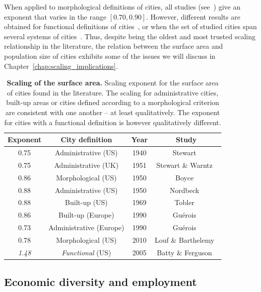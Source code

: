 When applied to morphological definitions of cities, all studies
(see~\cite{Batty:2011}) give an exponent that varies in the range $[0.70,
0.90]$. However, different results are obtained for functional definitions of
cities~\cite{Batty:2011}, or when the set of studied cities span several systems of
cities~\cite{Fuller:2009}. Thus, despite being the oldest and most trusted scaling relationship in the
literature, the relation between the surface area and population size of cities
exhibits some of the issues we will discuss in
Chapter~\ref{chap:scaling_implications}.


\begin{table}[!h]
    \centering
\begin{tabular}{|cccc|}
\hline
Exponent & City definition & Year & Study\\
\hline
0.75 & Administrative (US) & 1940 & Stewart~\cite{Stewart:1947}\\
0.75 & Administrative (UK) & 1951 & Stewart \& Warntz~\cite{Stewart:1958}\\
0.86 & Morphological (US) & 1950 & Boyce~\cite{Boyce:1963}\\
0.88 & Administrative (US) & 1950 & Nordbeck~\cite{Nordbeck:1965}\\
0.88 & Built-up (US) & 1969 & Tobler~\cite{Tobler:1969}\\
0.86 & Built-up (Europe) & 1990 & Gu\'erois~\cite{Guerois:2003}\\
0.73 & Administrative (Europe) & 1990 & Gu\'erois~\cite{Guerois:2003}\\
0.78 & Morphological (US) & 2010 & Louf \& Barthelemy~\cite{Louf:2014_scaling}\\
\hline
\emph{1.48} & \emph{Functional} (US) & 2005 & Batty \& Ferguson~\cite{Batty:2011}\\
\hline
\end{tabular}
\caption{{\bf Scaling of the surface area.} Scaling exponent for the surface area of
cities found in the literature. The scaling for administrative cities, built-up
areas or cities defined according to a morphological criterion are consistent
with one another -- at least qualitatively. The exponent for cities with a
functional definition is however qualitatively different.}
\label{tab:area}
\end{table}



\subsection{Economic diversity and employment}
\label{sub:economic_diversity}

